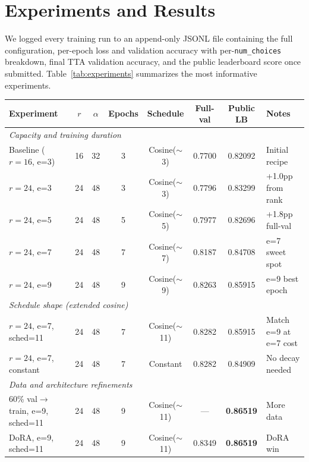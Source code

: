 \documentclass[11pt]{article}
\begin{document}
\section{Experiments and Results}

We logged every training run to an append-only JSONL file containing the full configuration, per-epoch loss and validation accuracy with per-\texttt{num\_choices} breakdown, final TTA validation accuracy, and the public leaderboard score once submitted. Table~\ref{tab:experiments} summarizes the most informative experiments.

\begin{table}[t]
\centering
\small
\begin{tabular}{lccccccl}
\toprule
\textbf{Experiment} & \textbf{$r$} & \textbf{$\alpha$} & \textbf{Epochs} & \textbf{Schedule} & \textbf{Full-val} & \textbf{Public LB} & \textbf{Notes} \\
\midrule
\multicolumn{8}{l}{\textit{Capacity and training duration}} \\
\midrule
Baseline ($r{=}16$, e=3) & 16 & 32 & 3 & Cosine($\sim$3) & 0.7700 & 0.82092 & Initial recipe \\
$r{=}24$, e=3            & 24 & 48 & 3 & Cosine($\sim$3) & 0.7796 & 0.83299 & +1.0pp from rank \\
$r{=}24$, e=5            & 24 & 48 & 5 & Cosine($\sim$5) & 0.7977 & 0.82696 & +1.8pp full-val \\
$r{=}24$, e=7            & 24 & 48 & 7 & Cosine($\sim$7) & 0.8187 & 0.84708 & e=7 sweet spot \\
$r{=}24$, e=9            & 24 & 48 & 9 & Cosine($\sim$9) & 0.8263 & 0.85915 & e=9 best epoch \\
\midrule
\multicolumn{8}{l}{\textit{Schedule shape (extended cosine)}} \\
\midrule
$r{=}24$, e=7, sched=11   & 24 & 48 & 7 & Cosine($\sim$11) & 0.8282 & 0.85915 & Match e=9 at e=7 cost \\
$r{=}24$, e=7, constant   & 24 & 48 & 7 & Constant         & 0.8282 & 0.84909 & No decay needed \\
\midrule
\multicolumn{8}{l}{\textit{Data and architecture refinements}} \\
\midrule
60\% val\(\to\)train, e=9, sched=11 & 24 & 48 & 9 & Cosine($\sim$11) & --- & \textbf{0.86519} & More data \\
DoRA, e=9, sched=11                & 24 & 48 & 9 & Cosine($\sim$11) & 0.8349 & \textbf{0.86519} & DoRA win \\

\end{tabular}
\end{table}
\end{document}

